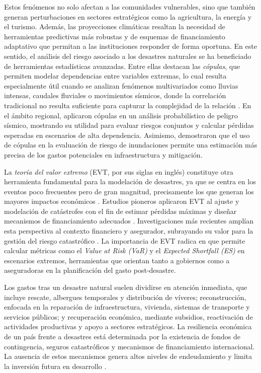 \documentclass[12pt, a4paper]{article}
\begin{document}
Estos fenómenos no solo afectan a las comunidades vulnerables, sino que también generan perturbaciones en sectores estratégicos como la agricultura, la energía y el turismo. Además, las proyecciones climáticas resaltan la necesidad de herramientas predictivas más robustas y de esquemas de financiamiento adaptativo que permitan a las instituciones responder de forma oportuna. En este sentido, el análisis del riesgo asociado a los desastres naturales se ha beneficiado de herramientas estadísticas avanzadas. Entre ellas destacan las \textit{cópulas}, que permiten modelar dependencias entre variables extremas, lo cual resulta especialmente útil cuando se analizan fenómenos multivariados como lluvias intensas, caudales fluviales o movimientos sísmicos, donde la correlación tradicional no resulta suficiente para capturar la complejidad de la relación \cite{patton2012review, krupskii2013factor}. En el ámbito regional,  aplicaron cópulas en un análisis probabilístico de peligro sísmico, mostrando su utilidad para evaluar riesgos conjuntos y calcular pérdidas esperadas en escenarios de alta dependencia. Asimismo,  demostraron que el uso de cópulas en la evaluación de riesgo de inundaciones permite una estimación más precisa de los gastos potenciales en infraestructura y mitigación.  

La \textit{teoría del valor extremo} (EVT, por sus siglas en inglés) constituye otra herramienta fundamental para la modelación de desastres, ya que se centra en los eventos poco frecuentes pero de gran magnitud, precisamente los que generan los mayores impactos económicos \cite{Siddiqui2022}. Estudios pioneros aplicaron EVT al ajuste y modelación de catástrofes con el fin de estimar pérdidas máximas y diseñar mecanismos de financiamiento adecuados \cite{PerezGarcia2004}. Investigaciones más recientes amplían esta perspectiva al contexto financiero y asegurador, subrayando su valor para la gestión del riesgo catastrófico \cite{DelfinerGutierrez2025}. La importancia de EVT radica en que permite calcular métricas como el \textit{Value at Risk (VaR)} y el \textit{Expected Shortfall (ES)} en escenarios extremos, herramientas que orientan tanto a gobiernos como a aseguradoras en la planificación del gasto post-desastre.  

Los gastos tras un desastre natural suelen dividirse en atención inmediata, que incluye rescate, albergues temporales y distribución de víveres; reconstrucción, enfocada en la reparación de infraestructura, vivienda, sistemas de transporte y servicios públicos; y recuperación económica, mediante subsidios, reactivación de actividades productivas y apoyo a sectores estratégicos. La resiliencia económica de un país frente a desastres está determinada por la existencia de fondos de contingencia, seguros catastróficos y mecanismos de financiamiento internacional. La ausencia de estos mecanismos genera altos niveles de endeudamiento y limita la inversión futura en desarrollo \cite{CentenoMorales2017,OrozcoMontoya2022}.  
\end{document}
